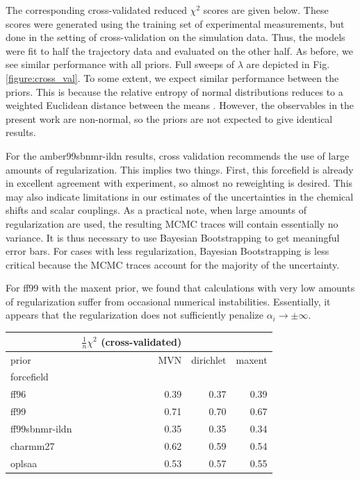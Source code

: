 \documentclass[12pt]{article}
\begin{document}
\vspace{5mm}

The corresponding cross-validated reduced $\chi^2$ scores are given below.  These scores were generated using the training set of experimental measurements, but done in the setting of cross-validation on the simulation data.  Thus, the models were fit to half the trajectory data and evaluated on the other half.  As before, we see similar performance with all priors.  Full sweeps of $\lambda$ are depicted in Fig. \ref{figure:cross_val}.  To some extent, we expect similar performance between the priors.  This is because the relative entropy of normal distributions reduces to a weighted Euclidean distance between the means \cite{relative_entropy_wiki}.  However, the observables in the present work are non-normal, so the priors are not expected to give identical results.

For the amber99sbnmr-ildn results, cross validation recommends the use of large amounts of regularization.  This implies two things.  First, this forcefield is already in excellent agreement with experiment, so almost no reweighting is desired.  This may also indicate limitations in our estimates of the uncertainties in the chemical shifts and scalar couplings.  As a practical note, when large amounts of regularization are used, the resulting MCMC traces will contain essentially no variance.  It is thus necessary to use Bayesian Bootstrapping to get meaningful error bars.  For cases with less regularization, Bayesian Bootstrapping is less critical because the MCMC traces account for the majority of the uncertainty.

For ff99 with the maxent prior, we found that calculations with very low amounts of regularization suffer from occasional numerical instabilities.  Essentially, it appears that the regularization does not sufficiently penalize $\alpha_i \rightarrow \pm \infty$.

\vspace{5mm}


\begin{tabular}{lrrr}
\toprule
{} &  $\frac{1}{n}\chi^2$ (cross-validated) & &          \\
\midrule
prior &       MVN &  dirichlet & maxent  \\
forcefield        &           &  &       \\
ff96           &      0.39 &       0.37 &    0.39 \\
ff99           &      0.71 &       0.70 &    0.67 \\
ff99sbnmr-ildn &      0.35 &       0.35 &    0.34 \\
charmm27          &      0.62 &       0.59 &    0.54 \\
oplsaa            &      0.53 &       0.57 &    0.55 \\
\bottomrule
\end{tabular}
\end{document}
